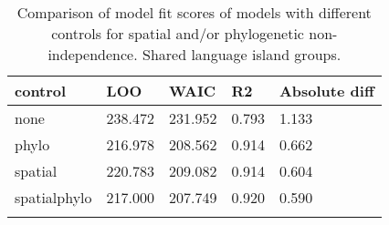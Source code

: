 \begin{longtable}{p{2cm}p{2cm}p{2cm}p{2cm}p{2cm}}
  \toprule
control & LOO & WAIC & R2 & Absolute diff \\ 
  \midrule
none & 238.472 & 231.952 & 0.793 & 1.133 \\ 
  phylo & 216.978 & 208.562 & 0.914 & 0.662 \\ 
  spatial & 220.783 & 209.082 & 0.914 & 0.604 \\ 
  spatialphylo & 217.000 & 207.749 & 0.920 & 0.590 \\ 
   \bottomrule
\caption{Comparison of model fit scores of models with different controls for spatial and/or phylogenetic non-independence. Shared language island groups.} 
\label{model_fit_score_table_medium}
\end{longtable}

